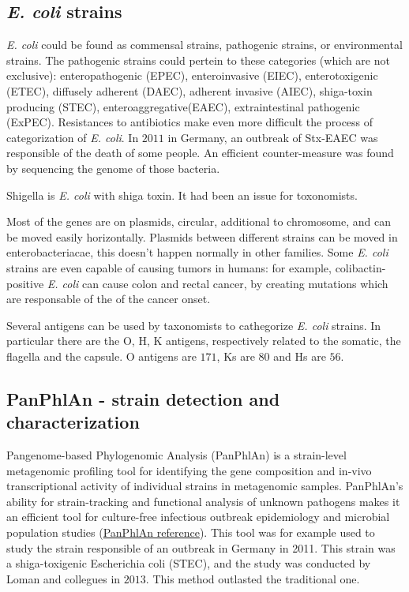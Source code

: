 \subsection{\emph{E. coli} strains}
\emph{E. coli} could be found as commensal strains, pathogenic strains, or environmental strains. The pathogenic strains could pertein to these categories (which are not exclusive): enteropathogenic (EPEC), enteroinvasive (EIEC), enterotoxigenic (ETEC), diffusely adherent (DAEC), adherent invasive (AIEC), shiga-toxin producing (STEC), enteroaggregative(EAEC), extraintestinal pathogenic (ExPEC). Resistances to antibiotics make even more difficult the process of categorization of \emph{E. coli}.
In $2011$ in Germany, an outbreak of Stx-EAEC was responsible of the death of some people. An efficient counter-measure was found by sequencing the genome of those bacteria.

Shigella is \emph{E. coli} with shiga toxin. It had been an issue for toxonomists.

Most of the genes are on plasmids, circular, additional to chromosome, and can be moved easily horizontally. Plasmids between different strains can be moved in enterobacteriacae, this doesn't happen normally in other families.
Some \emph{E. coli} strains are even capable of causing tumors in humans: for example, colibactin-positive \emph{\emph{E. coli}} can cause colon and rectal cancer, by creating mutations which are responsable of the of the cancer onset.

Several antigens can be used by taxonomists to cathegorize \emph{E. coli} strains. In particular there are the O, H, K antigens, respectively related to the somatic, the flagella and the capsule. O antigens are $171$, Ks are $80$ and Hs are $56$.

\subsection{PanPhlAn - strain detection and characterization}

Pangenome-based Phylogenomic Analysis (PanPhlAn) is a strain-level metagenomic profiling tool for identifying the gene composition and in-vivo transcriptional activity of individual strains in metagenomic samples. PanPhlAn’s ability for strain-tracking and functional analysis of unknown pathogens makes it an efficient tool for culture-free infectious outbreak epidemiology and microbial population studies (\href{http://segatalab.cibio.unitn.it/tools/panphlan/}{PanPhlAn reference}). This tool was for example used to study the strain responsible of an outbreak in Germany in 2011. This strain was a shiga-toxigenic Escherichia coli (STEC), and the study was conducted by Loman and collegues in $2013$.
This method outlasted the traditional one.


